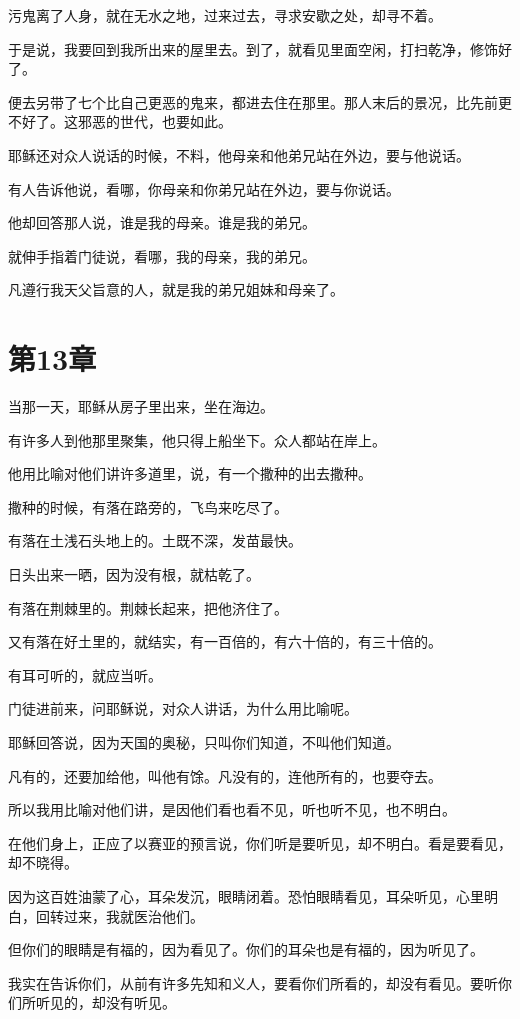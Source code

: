 \documentclass[12pt,oneside]{book}
\begin{document}
污鬼离了人身，就在无水之地，过来过去，寻求安歇之处，却寻不着。

于是说，我要回到我所出来的屋里去。到了，就看见里面空闲，打扫乾净，修饰好了。

便去另带了七个比自己更恶的鬼来，都进去住在那里。那人末后的景况，比先前更不好了。这邪恶的世代，也要如此。

耶稣还对众人说话的时候，不料，他母亲和他弟兄站在外边，要与他说话。

有人告诉他说，看哪，你母亲和你弟兄站在外边，要与你说话。

他却回答那人说，谁是我的母亲。谁是我的弟兄。

就伸手指着门徒说，看哪，我的母亲，我的弟兄。

凡遵行我天父旨意的人，就是我的弟兄姐妹和母亲了。

\chapter{第13章}
当那一天，耶稣从房子里出来，坐在海边。

有许多人到他那里聚集，他只得上船坐下。众人都站在岸上。

他用比喻对他们讲许多道里，说，有一个撒种的出去撒种。

撒种的时候，有落在路旁的，飞鸟来吃尽了。

有落在土浅石头地上的。土既不深，发苗最快。

日头出来一晒，因为没有根，就枯乾了。

有落在荆棘里的。荆棘长起来，把他济住了。

又有落在好土里的，就结实，有一百倍的，有六十倍的，有三十倍的。

有耳可听的，就应当听。

门徒进前来，问耶稣说，对众人讲话，为什么用比喻呢。

耶稣回答说，因为天国的奥秘，只叫你们知道，不叫他们知道。

凡有的，还要加给他，叫他有馀。凡没有的，连他所有的，也要夺去。

所以我用比喻对他们讲，是因他们看也看不见，听也听不见，也不明白。

在他们身上，正应了以赛亚的预言说，你们听是要听见，却不明白。看是要看见，却不晓得。

因为这百姓油蒙了心，耳朵发沉，眼睛闭着。恐怕眼睛看见，耳朵听见，心里明白，回转过来，我就医治他们。

但你们的眼睛是有福的，因为看见了。你们的耳朵也是有福的，因为听见了。

我实在告诉你们，从前有许多先知和义人，要看你们所看的，却没有看见。要听你们所听见的，却没有听见。
\end{document}
